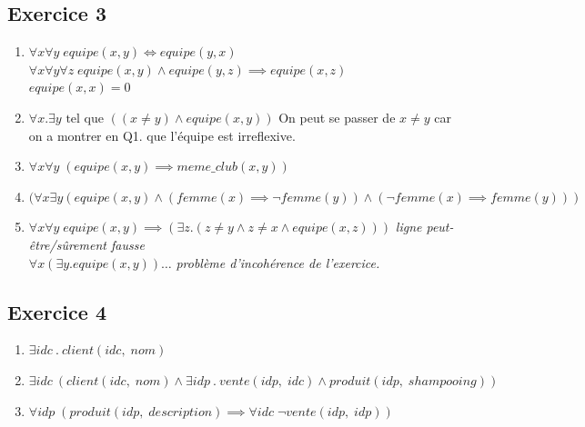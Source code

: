 \documentclass[a4paper]{article}
\begin{document}
\begin{spacing}{1.25}
\subsection*{Exercice 3}
\begin{enumerate}
  \item $\forall x \forall y \; equipe(x,y) \iff equipe(y,x)$\\
    $\forall x \forall y \forall z \; equipe(x,y) \land equipe(y,z) \implies equipe(x,z)$\\
    $equipe(x,x) = 0$\\
  \item $\forall x . \exists y \text{ tel que } ((x\ne y)\land equipe(x,y))$ On peut se passer de $x \ne y$ car on a montrer en Q1. que l'équipe est irreflexive.\\
  \item $\forall x \forall y \; (equipe(x,y) \implies meme\_club(x,y))$\\
  \item $(\forall x \exists y (equipe(x, y) \land (femme(x) \implies \lnot femme(y)) \land (\lnot femme(x) \implies femme(y)))$\\
  \item $\forall x \forall y\; equipe(x,y) \implies (\exists z .(z \ne y \land  z \ne x \land equipe(x,z)))$ \emph{ligne peut-être/sûrement fausse}\\
    $\forall x (\exists y . equipe(x,y)) \hdots $ \emph{problème d'incohérence de l'exercice.}\\
\end{enumerate}
\subsection*{Exercice 4}
\begin{enumerate}
  \item $\exists idc \: . \: client(idc, \; nom)$\\
  \item $\exists idc \: (client(idc, \; nom) \land \exists idp \: . \: vente(idp,\; idc) \land produit(idp, \; shampooing )) $\\
  \item $\forall idp \; (produit(idp, \; description)\implies \forall idc \; \lnot vente(idp, \; idp))$\\
\end{enumerate}

\end{spacing}
\end{document}
